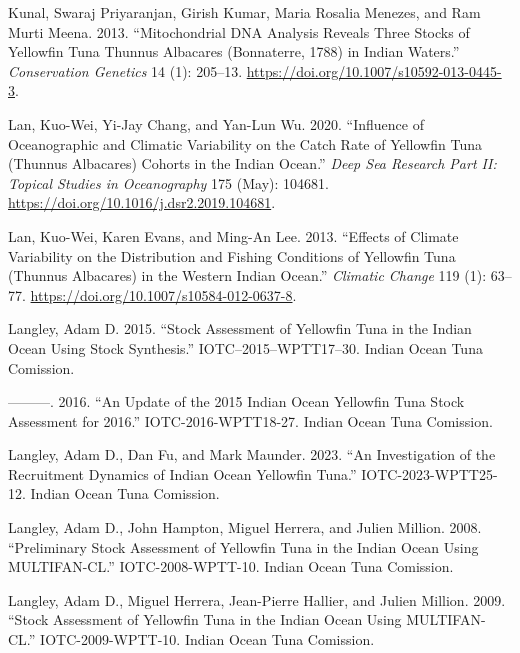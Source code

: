 \documentclass[
]{scrartcl}
\newlength{\cslhangindent}
\newenvironment{CSLReferences}[2] %
 {\begin{list}{}{%
  \setlength{\itemindent}{0pt}
  \setlength{\leftmargin}{0pt}
  \setlength{\parsep}{0pt}
  \ifodd #1
   \setlength{\leftmargin}{\cslhangindent}
   \setlength{\itemindent}{-1\cslhangindent}
  \fi
  \setlength{\itemsep}{#2\baselineskip}}}
 {\end{list}}
\begin{document}
\begin{CSLReferences}{1}{0}
Kunal, Swaraj Priyaranjan, Girish Kumar, Maria Rosalia Menezes, and Ram
Murti Meena. 2013. {``Mitochondrial {DNA} Analysis Reveals Three Stocks
of Yellowfin Tuna {Thunnus} Albacares ({Bonnaterre}, 1788) in {Indian}
Waters.''} \emph{Conservation Genetics} 14 (1): 205--13.
\url{https://doi.org/10.1007/s10592-013-0445-3}.

Lan, Kuo-Wei, Yi-Jay Chang, and Yan-Lun Wu. 2020. {``Influence of
Oceanographic and Climatic Variability on the Catch Rate of Yellowfin
Tuna ({Thunnus} Albacares) Cohorts in the {Indian Ocean}.''} \emph{Deep
Sea Research Part II: Topical Studies in Oceanography} 175 (May):
104681. \url{https://doi.org/10.1016/j.dsr2.2019.104681}.

Lan, Kuo-Wei, Karen Evans, and Ming-An Lee. 2013. {``Effects of Climate
Variability on the Distribution and Fishing Conditions of Yellowfin Tuna
({Thunnus} Albacares) in the Western {Indian Ocean}.''} \emph{Climatic
Change} 119 (1): 63--77.
\url{https://doi.org/10.1007/s10584-012-0637-8}.

Langley, Adam D. 2015. {``Stock Assessment of Yellowfin Tuna in the
{Indian Ocean} Using {Stock Synthesis}.''} IOTC--2015--WPTT17--30.
Indian Ocean Tuna Comission.

---------. 2016. {``An Update of the 2015 {Indian Ocean Yellowfin Tuna}
Stock Assessment for 2016.''} IOTC-2016-WPTT18-27. Indian Ocean Tuna
Comission.

Langley, Adam D., Dan Fu, and Mark Maunder. 2023. {``An Investigation of
the Recruitment Dynamics of {Indian Ocean} Yellowfin Tuna.''}
IOTC-2023-WPTT25-12. Indian Ocean Tuna Comission.

Langley, Adam D., John Hampton, Miguel Herrera, and Julien Million.
2008. {``Preliminary Stock Assessment of Yellowfin Tuna in the {Indian
Ocean} Using {MULTIFAN-CL}.''} IOTC-2008-WPTT-10. Indian Ocean Tuna
Comission.

Langley, Adam D., Miguel Herrera, Jean-Pierre Hallier, and Julien
Million. 2009. {``Stock Assessment of Yellowfin Tuna in the {Indian
Ocean} Using {MULTIFAN-CL}.''} IOTC-2009-WPTT-10. Indian Ocean Tuna
Comission.


\end{CSLReferences}
\end{document}
